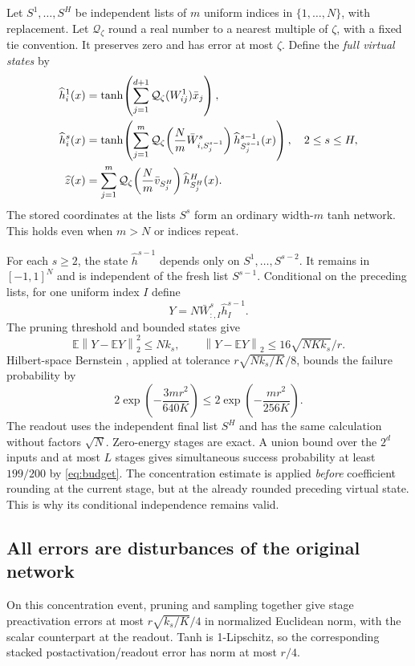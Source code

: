 \documentclass[11pt]{article}
\newcommand{\E}{\mathbb E}
\newcommand{\norm}[1]{\left\|#1\right\|}
\begin{document}
Let $S^1,\ldots,S^H$ be independent lists of $m$ uniform indices in
$\{1,\ldots,N\}$, with replacement. Let $\mathcal Q_\zeta$ round a real
number to a nearest multiple of $\zeta$, with a fixed tie convention.
It preserves zero and has error at most $\zeta$. Define the \emph{full
virtual states} by
\begin{align}
 \widehat h^1_i(x)&=\tanh\!\left(
       \sum_{j=1}^{d+1}\mathcal Q_\zeta(W^1_{ij})\bar x_j\right),\notag\\
 \widehat h^s_i(x)&=\tanh\!\left(
       \sum_{j=1}^m
       \mathcal Q_\zeta\!\left(\frac Nm\bar W^s_{i,S^{s-1}_j}\right)
       \widehat h^{s-1}_{S^{s-1}_j}(x)\right),\quad 2\le s\le H,\notag\\
 \widehat z(x)&=\sum_{j=1}^m
       \mathcal Q_\zeta\!\left(\frac Nm\bar v_{S^H_j}\right)
       \widehat h^H_{S^H_j}(x).
 \label{eq:virtual}
\end{align}
The stored coordinates at the lists $S^s$ form an ordinary width-$m$
tanh network. This holds even when $m>N$ or indices repeat.

For each $s\ge2$, the state $\widehat h^{s-1}$ depends only on
$S^1,\ldots,S^{s-2}$. It remains in $[-1,1]^N$ and is independent of
the fresh list $S^{s-1}$. Conditional on the preceding lists, for one
uniform index $I$ define
\[
 Y=N\bar W^s_{:,I}\widehat h^{s-1}_I.
\]
The pruning threshold and bounded states give
\[
 \E\norm{Y-\E Y}_2^2\le Nk_s,\qquad
 \norm{Y-\E Y}_2\le16\sqrt{NKk_s}/r.
\]
Hilbert-space Bernstein \cite{tarres-yao}, applied at tolerance
$r\sqrt{Nk_s/K}/8$, bounds the failure probability by
\[
 2\exp\!\left(-\frac{3mr^2}{640K}\right)
 \le 2\exp\!\left(-\frac{mr^2}{256K}\right).
\]
The readout uses the independent final list $S^H$ and has the same
calculation without factors $\sqrt N$. Zero-energy stages are exact.
A union bound over the $2^d$ inputs and at most $L$ stages gives
simultaneous success probability at least $199/200$ by \eqref{eq:budget}.
The concentration estimate is applied \emph{before} coefficient rounding
at the current stage, but at the already rounded preceding virtual state.
This is why its conditional independence remains valid.

\subsection{All errors are disturbances of the original network}
On this concentration event, pruning and sampling together give stage
preactivation errors at most $r\sqrt{k_s/K}/4$ in normalized Euclidean
norm, with the scalar counterpart at the readout. Tanh is 1-Lipschitz,
so the corresponding stacked postactivation/readout error has norm at
most $r/4$.
\end{document}
